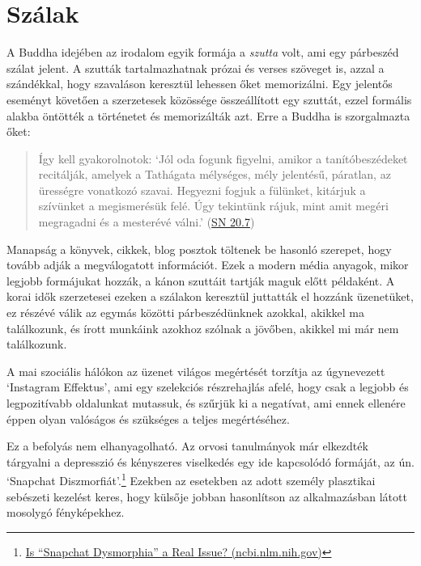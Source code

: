 
\vfill\null

\clearpage

\section{Szálak}


\noindent A Buddha idejében az irodalom egyik formája a \emph{szutta}
volt, ami egy párbeszéd szálat jelent. A szutták tartalmazhatnak prózai
és verses szöveget is, azzal a szándékkal, hogy szavaláson keresztül
lehessen őket memorizálni. Egy jelentős eseményt követően a szerzetesek
közössége összeállított egy szuttát, ezzel formális alakba öntötték a
történetet és memorizálták azt. Erre a Buddha is szorgalmazta őket:

\begin{quote}
Így kell gyakorolnotok: `Jól oda fogunk figyelni, amikor a
tanítóbeszédeket recitálják, amelyek a Tathágata mélységes, mély
jelentésű, páratlan, az ürességre vonatkozó szavai. Hegyezni fogjuk a
fülünket, kitárjuk a szívünket a megismerésük felé. Úgy tekintünk rájuk,
mint amit megéri megragadni és a mesterévé válni.'
(\href{https://a-buddha-ujja.hu/sn-20.7/hu/fenyvesi-robert}{SN 20.7})
\end{quote}

Manapság a könyvek, cikkek, blog posztok töltenek be hasonló szerepet,
hogy tovább adják a megválogatott információt. Ezek a modern média
anyagok, mikor legjobb formájukat hozzák, a kánon szuttáit tartják maguk
előtt példaként. A korai idők szerzetesei ezeken a szálakon keresztül
juttatták el hozzánk üzenetüket, ez részévé válik az egymás közötti
párbeszédünknek azokkal, akikkel ma találkozunk, és írott munkáink
azokhoz szólnak a jövőben, akikkel mi már nem találkozunk.

\clearpage


A mai szociális hálókon az üzenet világos megértését torzítja az
úgynevezett `Instagram Effektus', ami egy szelekciós részrehajlás afelé,
hogy csak a legjobb és legpozitívabb oldalunkat mutassuk, és szűrjük ki
a negatívat, ami ennek ellenére éppen olyan valóságos és szükséges a
teljes megértéséhez.

Ez a befolyás nem elhanyagolható. Az orvosi tanulmányok már elkezdték
tárgyalni a depresszió és kényszeres viselkedés egy ide kapcsolódó
formáját, az ún. `Snapchat Diszmorfiát'.\footnote{\href{https://www.ncbi.nlm.nih.gov/pmc/articles/PMC5933578/}{Is
  ``Snapchat Dysmorphia'' a Real Issue? (ncbi.nlm.nih.gov)}} Ezekben az
esetekben az adott személy plasztikai sebészeti kezelést keres, hogy
külsője jobban hasonlítson az alkalmazásban látott mosolygó
fényképekhez.

